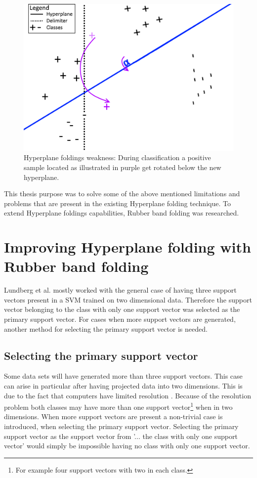 \documentclass[a4paper,twoside]{bth}
\begin{document}
\begin{figure}
\centering
\includegraphics[scale=1]{images/intro-images/hyperplaneExplanation3.png}
   \caption{Hyperplane foldings weakness: During classification a positive sample located as illustrated in purple get rotated below the new hyperplane.}
   \label{fig:hpf_weakness}
\end{figure}

\par This thesis purpose was to solve some of the above mentioned limitations and problems that are present in the existing Hyperplane folding technique. To extend Hyperplane foldings capabilities, Rubber band folding was researched. 

\section{Improving Hyperplane folding with Rubber band folding} 

Lundberg et al. \cite{unpublished} mostly worked with the general case of having three support vectors present in a SVM trained on two dimensional data. Therefore the support vector belonging to the class with only one support vector was selected as the primary support vector. For cases when more support vectors are generated, another method for selecting the primary support vector is needed.
\subsection{Selecting the primary support vector}

\par Some data sets will have generated more than three support vectors. This case can arise in particular after having projected data into two dimensions. This is due to the fact that computers have limited resolution \cite{unpublished}. Because of the resolution problem both classes may have more than one support vector\footnote{For example four support vectors with two in each class.} when in two dimensions. When more support vectors are present a non-trivial case is introduced, when selecting the primary support vector. Selecting the primary support vector as the support vector from '... the class with only one support vector' \cite{unpublished} would simply be impossible having no class with only one support vector.
\end{document}
